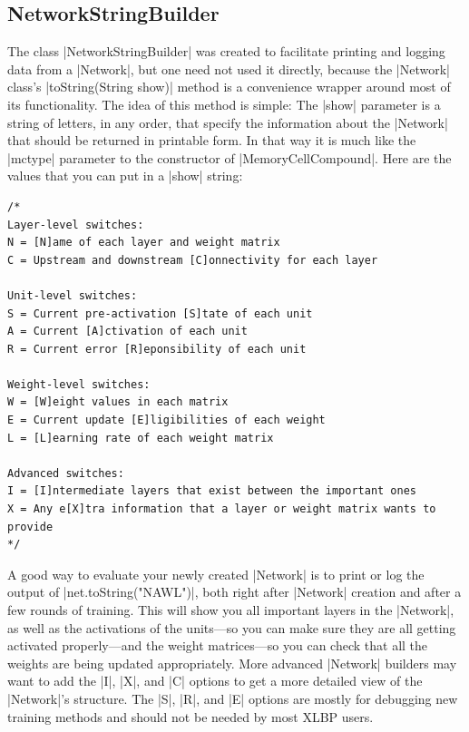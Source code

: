 \documentclass{article}
\begin{document}
\subsection{NetworkStringBuilder}
The class |NetworkStringBuilder| was created to facilitate printing and logging data from a |Network|, but one need not used it directly, because the |Network| class's |toString(String show)| method is a convenience wrapper around most of its functionality. The idea of this method is simple: The |show| parameter is a string of letters, in any order, that specify the information about the |Network| that should be returned in printable form. In that way it is much like the |mctype| parameter to the constructor of |MemoryCellCompound|. Here are the values that you can put in a |show| string:

\begin{verbatim}
/*
Layer-level switches:
N = [N]ame of each layer and weight matrix
C = Upstream and downstream [C]onnectivity for each layer

Unit-level switches:
S = Current pre-activation [S]tate of each unit
A = Current [A]ctivation of each unit
R = Current error [R]eponsibility of each unit

Weight-level switches:
W = [W]eight values in each matrix
E = Current update [E]ligibilities of each weight
L = [L]earning rate of each weight matrix

Advanced switches:
I = [I]ntermediate layers that exist between the important ones
X = Any e[X]tra information that a layer or weight matrix wants to provide
*/
\end{verbatim}

A good way to evaluate your newly created |Network| is to print or log the output of
|net.toString("NAWL")|, both right after |Network| creation and after a few rounds of training. This will show you all important layers in the |Network|, as well as the activations of the units---so you can make sure they are all getting activated properly---and the weight matrices---so you can check that all the weights are being updated appropriately. More advanced |Network| builders may want to add the |I|, |X|, and |C| options to get a more detailed view of the |Network|'s structure. The |S|, |R|, and |E| options are mostly for debugging new training methods and should not be needed by most XLBP users.
\end{document}
